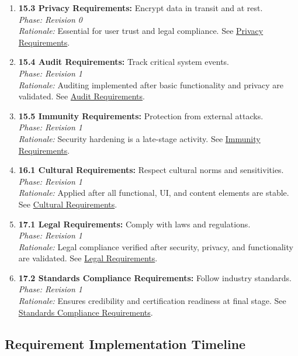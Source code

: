\documentclass[11pt]{article}
\begin{document}
\begin{enumerate}
    \item \textbf{15.3 Privacy Requirements:} Encrypt data in transit and at rest.\\
    \textit{Phase: Revision 0} \\
    \textit{Rationale:} Essential for user trust and legal compliance. See \hyperref[subsec:privacy]{Privacy Requirements}.

    \item \textbf{15.4 Audit Requirements:} Track critical system events.\\
    \textit{Phase: Revision 1} \\
    \textit{Rationale:} Auditing implemented after basic functionality and privacy are validated. See \hyperref[subsec:audit]{Audit Requirements}.

    \item \textbf{15.5 Immunity Requirements:} Protection from external attacks.\\
    \textit{Phase: Revision 1} \\
    \textit{Rationale:} Security hardening is a late-stage activity. See \hyperref[subsec:immunity]{Immunity Requirements}.

    \item \textbf{16.1 Cultural Requirements:} Respect cultural norms and sensitivities.\\
    \textit{Phase: Revision 1} \\
    \textit{Rationale:} Applied after all functional, UI, and content elements are stable. See \hyperref[subsec:cultural]{Cultural Requirements}.

    \item \textbf{17.1 Legal Requirements:} Comply with laws and regulations.\\
    \textit{Phase: Revision 1} \\
    \textit{Rationale:} Legal compliance verified after security, privacy, and functionality are validated. See \hyperref[subsec:legal]{Legal Requirements}.

    \item \textbf{17.2 Standards Compliance Requirements:} Follow industry standards.\\
    \textit{Phase: Revision 1} \\
    \textit{Rationale:} Ensures credibility and certification readiness at final stage. See \hyperref[subsec:standards]{Standards Compliance Requirements}.
\end{enumerate}
\subsection{Requirement Implementation Timeline}
\end{document}
